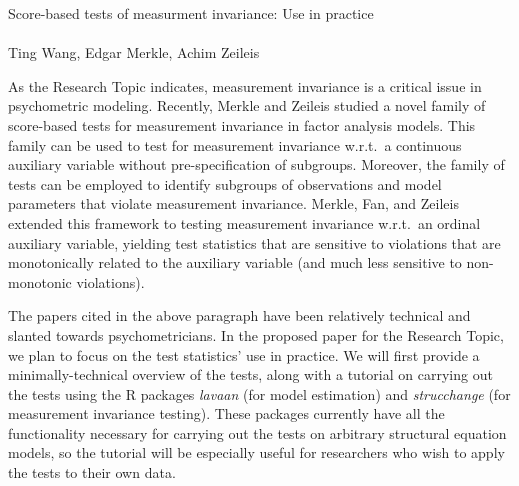 \documentclass[11pt]{article}
\begin{document}
{\large
\begin{center}
 Score-based tests of measurment invariance: Use
in practice\\ \ \\

 Ting Wang, Edgar Merkle, Achim Zeileis
\end{center}}

\pagestyle{empty}




As the Research Topic indicates, measurement invariance is a critical issue in
psychometric modeling. Recently, Merkle and Zeileis \citeyear{MerZei13} studied
a novel family of score-based tests for measurement invariance in factor
analysis models. This family can be used to test for measurement invariance
w.r.t.\ a continuous auxiliary variable without pre-specification of subgroups.
Moreover, the family of tests can be employed to identify subgroups of
observations and model parameters that violate measurement invariance. Merkle,
Fan, and Zeileis \citeyear{MerFanZei} extended this framework to testing
measurement invariance w.r.t.\ an ordinal auxiliary variable, yielding test
statistics that are sensitive to violations that are monotonically related to
the auxiliary variable (and much less sensitive to non-monotonic violations).

The papers cited in the above paragraph have been relatively technical and
slanted towards psychometricians. In the proposed paper for the Research Topic,
we plan to focus on the test statistics' use in practice. We will first
provide a minimally-technical overview of the tests, along with a tutorial on
carrying out the tests using the {R} packages \emph{lavaan} (for model estimation) and
\emph{strucchange} (for measurement invariance testing). These packages currently have
all the functionality necessary for carrying out the tests on arbitrary
structural equation models, so the tutorial will be especially useful for
researchers who wish to apply the tests to their own data.

\end{document}

